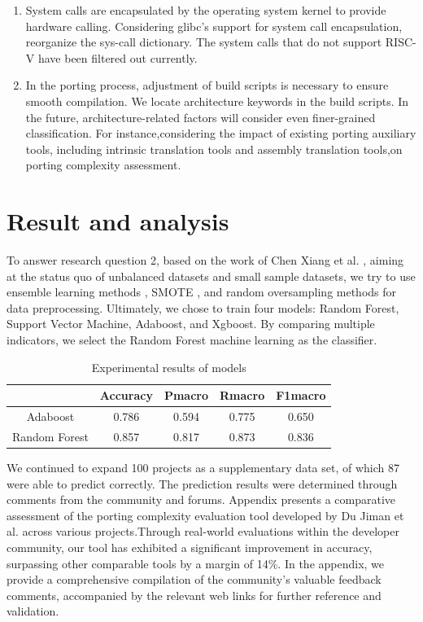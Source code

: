 \documentclass[sigconf,screen,review,anonymous]{acmart}
\begin{document}
\begin{enumerate}
  \item System calls are encapsulated by the operating system kernel to provide hardware calling.
  Considering glibc's support for system call encapsulation, reorganize the sys-call dictionary.
  The system calls that do not support RISC-V have been filtered out currently.
  \item In the porting process, adjustment of build scripts is necessary to ensure smooth compilation.
  We locate architecture keywords in the build scripts.
  In the future, architecture-related factors will consider even finer-grained classification.
  For instance,considering the impact of existing porting auxiliary tools, including intrinsic translation tools and assembly translation tools,on porting complexity assessment.
\end{enumerate}

\section{Result and analysis}

To answer research question 2, based on the work of Chen Xiang et al. \cite{5128907}, aiming at the status quo of unbalanced datasets and small sample datasets, we try to use ensemble learning methods \cite{6509481}, SMOTE \cite{4271036}, and random oversampling methods for data preprocessing.
Ultimately, we chose to train four models: Random Forest, Support Vector Machine, Adaboost, and Xgboost.
By comparing multiple indicators, we select the Random Forest machine learning as the classifier.

\begin{table}
  \caption{ Experimental results of models}
  \label{tab:evaluation}
  \begin{tabular}{ccccc}
    \toprule
     & Accuracy & Pmacro & Rmacro & F1macro \\
    \midrule
    Adaboost & 0.786 & 0.594 & 0.775 & 0.650 \\
    Random Forest & 0.857 & 0.817 & 0.873 & 0.836 \\
  \bottomrule
\end{tabular}
\end{table}

We continued to expand 100 projects as a supplementary data set, of which 87 were able to predict correctly.
The prediction results were determined through comments from the community and forums.
Appendix presents a comparative assessment of the porting complexity evaluation tool developed by Du Jiman et al. across various projects.Through real-world evaluations within the developer community, our tool has exhibited a significant improvement in accuracy, surpassing other comparable tools by a margin of 14\%. In the appendix, we provide a comprehensive compilation of the community's valuable feedback comments, accompanied by the relevant web links for further reference and validation.
\end{document}
